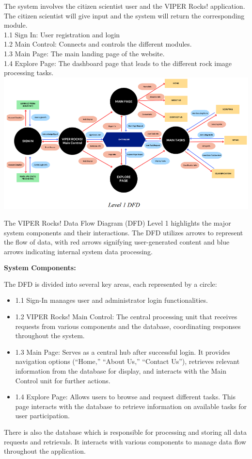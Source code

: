 \documentclass{article}
\begin{document}
The system involves the citizen scientist user and the VIPER Rocks! application. The citizen scientist will give input and the system will return the corresponding module. \\
1.1 Sign In: User registration and login \\
1.2 Main Control: Connects and controls the different modules. \\
1.3 Main Page: The main landing page of the website. \\
1.4 Explore Page: The dashboard page that leads to the different rock image processing tasks. \\
\includegraphics{DFD_1}

The VIPER Rocks! Data Flow Diagram (DFD) Level 1 highlights the major system components and their interactions. The DFD utilizes arrows to represent the flow of data, with red arrows signifying user-generated content and blue arrows indicating internal system data processing.

\textbf{System Components:}

The DFD is divided into several key areas, each represented by a circle:
\begin{itemize}
	\item 1.1 Sign-In manages user and administrator login functionalities.
	\item 1.2 VIPER Rocks! Main Control: The central processing unit that receives requests from various components and the database, coordinating responses throughout the system. 
	\item 1.3 Main Page: Serves as a central hub after successful login. It provides navigation options (“Home,” “About Us,” “Contact Us”), retrieves relevant information from the database for display, and interacts with the Main Control unit for further actions.
	\item 1.4 Explore Page: Allows users to browse and request different tasks. This page interacts with the database to retrieve information on available tasks for user participation.
\end{itemize}
There is also the database which is responsible for processing and storing all data requests and retrievals. It interacts with various components to manage data flow throughout the application.
\end{document}
